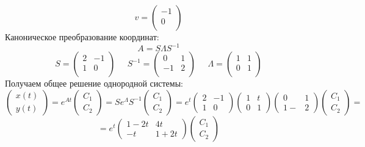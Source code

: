 \documentclass[a4paper, 12pt]{article}
\begin{document}
\[v=
\left(
\begin{array}{cc}
-1\\
0\\
\end{array}
\right)
\]
Каноническое преобразование координат:
\[A = S\Lambda S^{-1}\]
\[
S = \left(
\begin{array}{cc}
2 & -1\\
1 & 0\\
\end{array}
\right)\;\;\;\;\;
S^{-1} = \left(
\begin{array}{cc}
0 & 1\\
-1 & 2\\
\end{array}\right)\;\;\;\;\;
\Lambda = \left(
\begin{array}{cc}
1 & 1\\
0 & 1\\
\end{array}\right)
\]
Получаем общее решение однородной системы:
\[\left(
\begin{array}{c}
x(t)\\
y(t)
\end{array}
\right)=e^{At}\left(
\begin{array}{c}
C_1 \\
C_2
\end{array}
\right)=Se^{\Lambda}S^{-1}\left(
\begin{array}{c}
C_1 \\
C_2
\end{array}
\right)=e^t
\left(
\begin{array}{cc}
2 & -1 \\
1 & 0
\end{array}
\right)
\left(
\begin{array}{cc}
1 & t \\
0 & 1
\end{array}
\right)
\left(
\begin{array}{cc}
0 & 1 \\
1- & 2
\end{array}
\right)\left(
\begin{array}{c}
C_1 \\
C_2
\end{array}
\right)=\]\[
=e^t
\left(
\begin{array}{cc}
1-2t & 4t \\
-t & 1+2t
\end{array}
\right)\left(
\begin{array}{c}
C_1 \\
C_2
\end{array}
\right)\]
\end{document}

